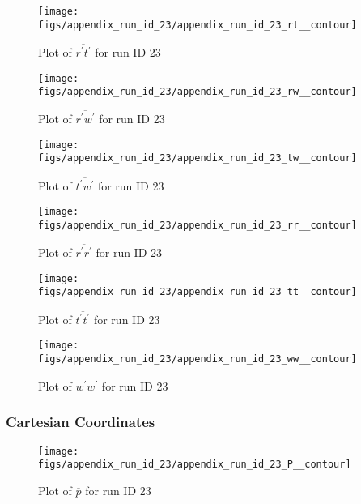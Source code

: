 \begin{figure}[H]
\centering
\texttt{[image: figs/appendix\_run\_id\_23/appendix\_run\_id\_23\_rt\_\_contour]}
\caption{Plot of $\overline{r^\prime t^\prime}$ for run ID 23}
\label{fig:appendix_run_id_23_rt__contour}
\end{figure}


\begin{figure}[H]
\centering
\texttt{[image: figs/appendix\_run\_id\_23/appendix\_run\_id\_23\_rw\_\_contour]}
\caption{Plot of $\overline{r^\prime w^\prime}$ for run ID 23}
\label{fig:appendix_run_id_23_rw__contour}
\end{figure}


\begin{figure}[H]
\centering
\texttt{[image: figs/appendix\_run\_id\_23/appendix\_run\_id\_23\_tw\_\_contour]}
\caption{Plot of $\overline{t^\prime w^\prime}$ for run ID 23}
\label{fig:appendix_run_id_23_tw__contour}
\end{figure}


\begin{figure}[H]
\centering
\texttt{[image: figs/appendix\_run\_id\_23/appendix\_run\_id\_23\_rr\_\_contour]}
\caption{Plot of $\overline{r^\prime r^\prime}$ for run ID 23}
\label{fig:appendix_run_id_23_rr__contour}
\end{figure}


\begin{figure}[H]
\centering
\texttt{[image: figs/appendix\_run\_id\_23/appendix\_run\_id\_23\_tt\_\_contour]}
\caption{Plot of $\overline{t^\prime t^\prime}$ for run ID 23}
\label{fig:appendix_run_id_23_tt__contour}
\end{figure}


\begin{figure}[H]
\centering
\texttt{[image: figs/appendix\_run\_id\_23/appendix\_run\_id\_23\_ww\_\_contour]}
\caption{Plot of $\overline{w^\prime w^\prime}$ for run ID 23}
\label{fig:appendix_run_id_23_ww__contour}
\end{figure}


\subsubsection{Cartesian Coordinates}
\begin{figure}[H]
\centering
\texttt{[image: figs/appendix\_run\_id\_23/appendix\_run\_id\_23\_P\_\_contour]}
\caption{Plot of $\overline{p}$ for run ID 23}
\label{fig:appendix_run_id_23_P__contour}
\end{figure}


